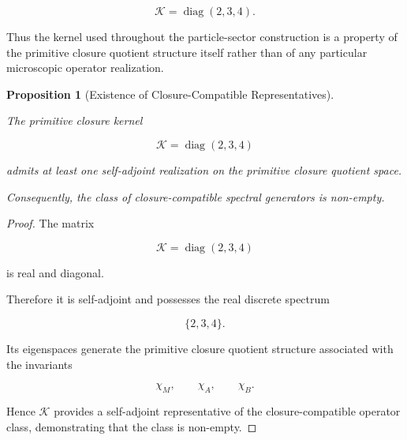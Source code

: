 \documentclass[11pt]{article}
\newtheorem{proposition}[theorem]{Proposition}
\theoremstyle{definition}
\theoremstyle{remark}
\begin{document}
\begin{equation}
\mathcal K =
\operatorname{diag}(2,3,4).
\end{equation}

Thus the kernel used throughout the particle-sector
construction is a property of the primitive closure quotient
structure itself rather than of any particular microscopic
operator realization.


\begin{proposition}[Existence of Closure-Compatible Representatives]
\label{prop:existence_closure_operators}

The primitive closure kernel

\begin{equation}
\mathcal K
=
\operatorname{diag}(2,3,4)
\end{equation}

admits at least one self-adjoint realization on the primitive
closure quotient space.

Consequently, the class of closure-compatible spectral
generators is non-empty.

\end{proposition}

\begin{proof}

The matrix

\begin{equation}
\mathcal K
=
\operatorname{diag}(2,3,4)
\end{equation}

is real and diagonal.

Therefore it is self-adjoint and possesses the real discrete
spectrum

\begin{equation}
\{2,3,4\}.
\end{equation}

Its eigenspaces generate the primitive closure quotient
structure associated with the invariants

\begin{equation}
\chi_M,
\qquad
\chi_A,
\qquad
\chi_B.
\end{equation}

Hence \(\mathcal K\) provides a self-adjoint representative of
the closure-compatible operator class, demonstrating that the
class is non-empty.

\end{proof}
\end{document}
